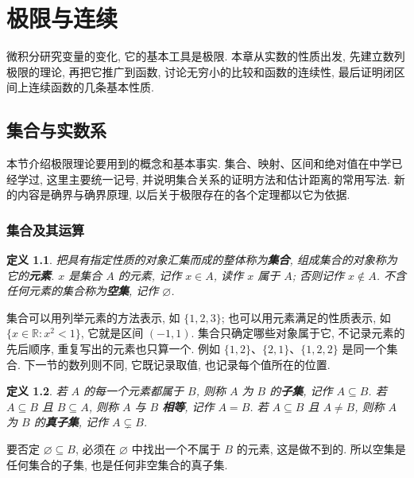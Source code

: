 \documentclass[UTF8,openany]{ctexbook}
\theoremstyle{chinesetextbook}
\newtheorem{definition}{定义}[section]
\begin{document}
\tableofcontents
\clearpage
\chapter{极限与连续}
微积分研究变量的变化, 它的基本工具是极限. 本章从实数的性质出发, 先建立数列极限的理论, 再把它推广到函数, 讨论无穷小的比较和函数的连续性, 最后证明闭区间上连续函数的几条基本性质.
\section{集合与实数系}
本节介绍极限理论要用到的概念和基本事实. 集合、映射、区间和绝对值在中学已经学过, 这里主要统一记号, 并说明集合关系的证明方法和估计距离的常用写法. 新的内容是确界与确界原理, 以后关于极限存在的各个定理都以它为依据.
\subsection{集合及其运算}
\begin{definition}
把具有指定性质的对象汇集而成的整体称为\textbf{集合}, 组成集合的对象称为它的\textbf{元素}. $x$ 是集合 $A$ 的元素, 记作 $x\in A$, 读作 $x$ 属于 $A$; 否则记作 $x\notin A$. 不含任何元素的集合称为\textbf{空集}, 记作 $\varnothing$.
\end{definition}
集合可以用列举元素的方法表示, 如 $\{1,2,3\}$; 也可以用元素满足的性质表示, 如 $\{x\in\mathbb R:x^2<1\}$, 它就是区间 $(-1,1)$. 集合只确定哪些对象属于它, 不记录元素的先后顺序, 重复写出的元素也只算一个. 例如 $\{1,2\}$、$\{2,1\}$、$\{1,2,2\}$ 是同一个集合. 下一节的数列则不同, 它既记录取值, 也记录每个值所在的位置.
\begin{definition}
若 $A$ 的每一个元素都属于 $B$, 则称 $A$ 为 $B$ 的\textbf{子集}, 记作 $A\subseteq B$. 若 $A\subseteq B$ 且 $B\subseteq A$, 则称 $A$ 与 $B$ \textbf{相等}, 记作 $A=B$. 若 $A\subseteq B$ 且 $A\ne B$, 则称 $A$ 为 $B$ 的\textbf{真子集}, 记作 $A\subsetneq B$.
\end{definition}
要否定 $\varnothing\subseteq B$, 必须在 $\varnothing$ 中找出一个不属于 $B$ 的元素, 这是做不到的. 所以空集是任何集合的子集, 也是任何非空集合的真子集.
\end{document}
